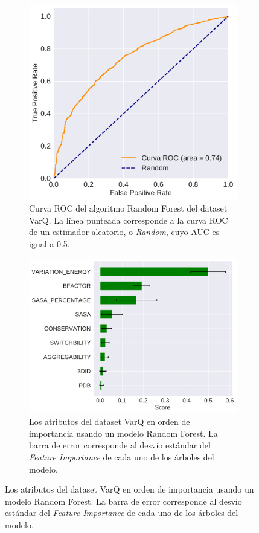\begin{figure}[H]
\centering
\begin{subfigure}{0.7\textwidth}
    \includegraphics[width=\textwidth]{documents/latex/figures/3/varq/auc_varq.pdf}
    \caption{Curva ROC del algoritmo Random Forest del dataset VarQ. La línea punteada corresponde a la curva ROC de un estimador aleatorio, o \textit{Random}, cuyo AUC es igual a 0.5.}
    \label{fig:auc_varq}
\end{subfigure}
\begin{subfigure}{0.7\textwidth}
    \includegraphics[width=\textwidth]{documents/latex/figures/3/varq/importances_varq.pdf}
    \caption{Los atributos del dataset VarQ en orden de importancia usando un modelo Random Forest. La barra de error corresponde al desvío estándar del \textit{Feature Importance} de cada uno de los árboles del modelo.}
    \label{fig:importance_varq}
\end{subfigure}
\end{figure}

